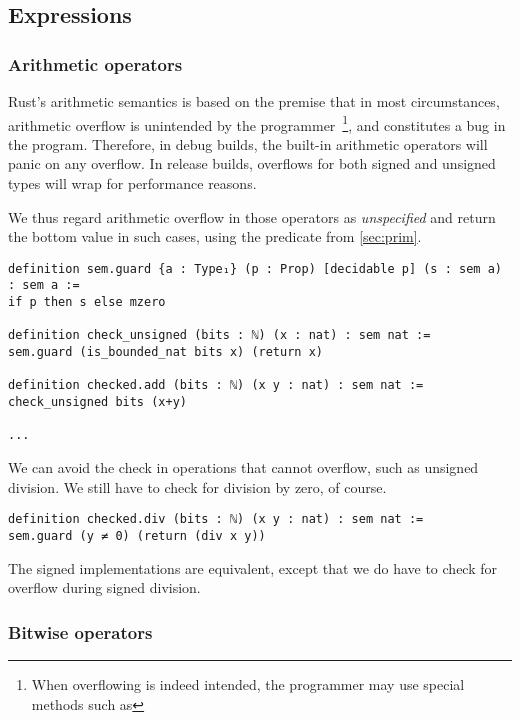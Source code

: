 \subsection{Expressions}

\subsubsection{Arithmetic operators}
\label{sec:arith}

Rust's arithmetic semantics is based on the premise that in most circumstances,
arithmetic overflow is unintended by the programmer~\footnote{When overflowing
  is indeed intended, the programmer may use special methods such as
  }, and constitutes a bug in
the program. Therefore, in debug builds, the built-in arithmetic operators will
panic on any overflow. In release builds, overflows for both signed and unsigned
types will wrap for performance reasons.

We thus regard arithmetic overflow in those operators as \emph{unspecified} and
return the bottom value in such cases, using the predicate
 from \autoref{sec:prim}.

\begin{verbatim}
definition sem.guard {a : Type₁} (p : Prop) [decidable p] (s : sem a) : sem a :=
if p then s else mzero

definition check_unsigned (bits : ℕ) (x : nat) : sem nat :=
sem.guard (is_bounded_nat bits x) (return x)

definition checked.add (bits : ℕ) (x y : nat) : sem nat :=
check_unsigned bits (x+y)

...
\end{verbatim}

We can avoid the check in operations that cannot overflow, such as unsigned
division. We still have to check for division by zero, of course.

\begin{verbatim}
definition checked.div (bits : ℕ) (x y : nat) : sem nat :=
sem.guard (y ≠ 0) (return (div x y))
\end{verbatim}

The signed implementations are equivalent, except that we do have to check for
overflow during signed division.

\subsubsection{Bitwise operators}

